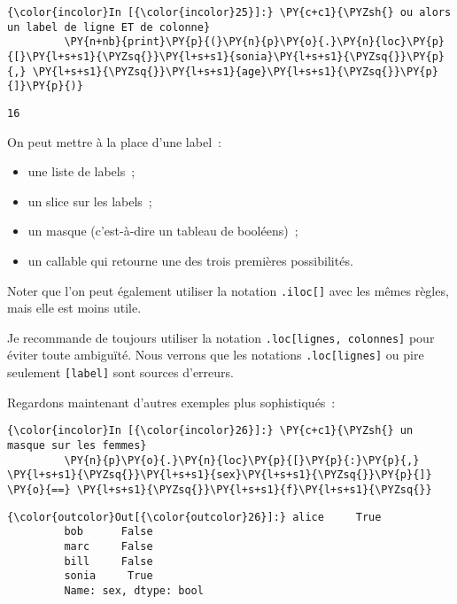     \begin{Verbatim}[commandchars=\\\{\},frame=single,framerule=0.3mm,rulecolor=\color{cellframecolor}]
{\color{incolor}In [{\color{incolor}25}]:} \PY{c+c1}{\PYZsh{} ou alors un label de ligne ET de colonne}
         \PY{n+nb}{print}\PY{p}{(}\PY{n}{p}\PY{o}{.}\PY{n}{loc}\PY{p}{[}\PY{l+s+s1}{\PYZsq{}}\PY{l+s+s1}{sonia}\PY{l+s+s1}{\PYZsq{}}\PY{p}{,} \PY{l+s+s1}{\PYZsq{}}\PY{l+s+s1}{age}\PY{l+s+s1}{\PYZsq{}}\PY{p}{]}\PY{p}{)}
\end{Verbatim}


    \begin{Verbatim}[commandchars=\\\{\},frame=single,framerule=0.3mm,rulecolor=\color{cellframecolor}]
16
\end{Verbatim}

    On peut mettre à la place d'une label~:

\begin{itemize}
\tightlist
\item
  une liste de labels~;
\item
  un slice sur les labels~;
\item
  un masque (c'est-à-dire un tableau de booléens)~;
\item
  un callable qui retourne une des trois premières possibilités.
\end{itemize}

Noter que l'on peut également utiliser la notation \texttt{.iloc{[}{]}}
avec les mêmes règles, mais elle est moins utile.

Je recommande de toujours utiliser la notation
\texttt{.loc{[}lignes,\ colonnes{]}} pour éviter toute ambiguïté. Nous
verrons que les notations \texttt{.loc{[}lignes{]}} ou pire seulement
\texttt{{[}label{]}} sont sources d'erreurs.

Regardons maintenant d'autres exemples plus sophistiqués~:

    \begin{Verbatim}[commandchars=\\\{\},frame=single,framerule=0.3mm,rulecolor=\color{cellframecolor}]
{\color{incolor}In [{\color{incolor}26}]:} \PY{c+c1}{\PYZsh{} un masque sur les femmes}
         \PY{n}{p}\PY{o}{.}\PY{n}{loc}\PY{p}{[}\PY{p}{:}\PY{p}{,} \PY{l+s+s1}{\PYZsq{}}\PY{l+s+s1}{sex}\PY{l+s+s1}{\PYZsq{}}\PY{p}{]} \PY{o}{==} \PY{l+s+s1}{\PYZsq{}}\PY{l+s+s1}{f}\PY{l+s+s1}{\PYZsq{}}
\end{Verbatim}


\begin{Verbatim}[commandchars=\\\{\},frame=single,framerule=0.3mm,rulecolor=\color{cellframecolor}]
{\color{outcolor}Out[{\color{outcolor}26}]:} alice     True
         bob      False
         marc     False
         bill     False
         sonia     True
         Name: sex, dtype: bool
\end{Verbatim}
            
